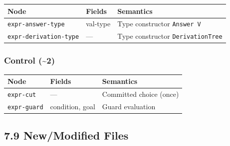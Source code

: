 \documentclass[11pt]{article}
\begin{document}
\begin{center}
\begin{tabular}{lll}
Node & Fields & Semantics\\
\hline
\texttt{expr-answer-type} & val-type & Type constructor \texttt{Answer V}\\
\texttt{expr-derivation-type} & — & Type constructor \texttt{DerivationTree}\\
\end{tabular}
\end{center}
\subsubsection{Control (\textasciitilde{}2)}
\label{sec:orga386d35}

\begin{center}
\begin{tabular}{lll}
Node & Fields & Semantics\\
\hline
\texttt{expr-cut} & — & Committed choice (once)\\
\texttt{expr-guard} & condition, goal & Guard evaluation\\
\end{tabular}
\end{center}
\subsection{7.9 New/Modified Files}
\label{sec:org77b7413}
\end{document}
